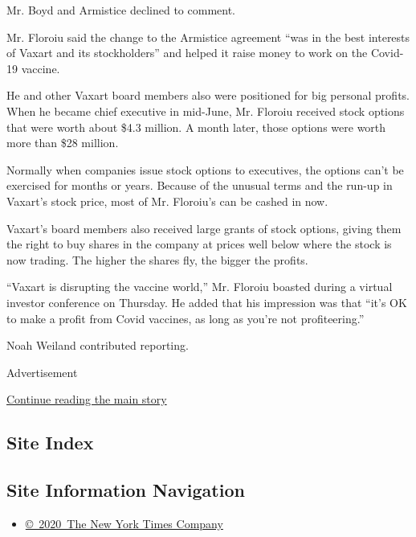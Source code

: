 Mr. Boyd and Armistice declined to comment.

Mr. Floroiu said the change to the Armistice agreement ``was in the best
interests of Vaxart and its stockholders'' and helped it raise money to
work on the Covid-19 vaccine.

He and other Vaxart board members also were positioned for big personal
profits. When he became chief executive in mid-June, Mr. Floroiu
received stock options that were worth about \$4.3 million. A month
later, those options were worth more than \$28 million.

Normally when companies issue stock options to executives, the options
can't be exercised for months or years. Because of the unusual terms and
the run-up in Vaxart's stock price, most of Mr. Floroiu's can be cashed
in now.

Vaxart's board members also received large grants of stock options,
giving them the right to buy shares in the company at prices well below
where the stock is now trading. The higher the shares fly, the bigger
the profits.

``Vaxart is disrupting the vaccine world,'' Mr. Floroiu boasted during a
virtual investor conference on Thursday. He added that his impression
was that ``it's OK to make a profit from Covid vaccines, as long as
you're not profiteering.''

Noah Weiland contributed reporting.

Advertisement

\protect\hyperlink{after-bottom}{Continue reading the main story}

\hypertarget{site-index}{%
\subsection{Site Index}\label{site-index}}

\hypertarget{site-information-navigation}{%
\subsection{Site Information
Navigation}\label{site-information-navigation}}

\begin{itemize}
\tightlist
\item
  \href{https://help.nytimes3xbfgragh.onion/hc/en-us/articles/115014792127-Copyright-notice}{©~2020~The
  New York Times Company}
\end{itemize}

